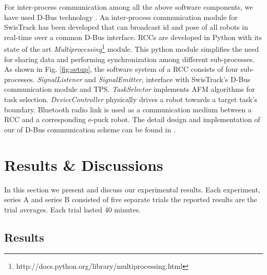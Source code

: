 \documentclass[smallcondensed]{svjour3}
\begin{document}
For inter-process communication among all the above software components, we have used D-Bus technology \citep{Pennington+2010}. An inter-process communication module for SwisTrack has been developed that can broadcast id and pose of all robots in real-time over a common D-Bus interface. RCCs are developed in Python with its state of the art \textit{Multiprocessing}\footnote{http://docs.python.org/library/multiprocessing.html} module. This python module simplifies the need for  sharing data and performing synchronization among different sub-processes. As shown in Fig. \ref{fig:setup}, the software system of a RCC consists of four sub-processes. {\em SignalListener} and {\em SignalEmitter}, interface with SwisTrack's D-Bus communication module and TPS. {\em TaskSelector} implements AFM algorithms for task selection. {\em DeviceController} physically drives a robot towards a target task's boundary. Bluetooth radio link is used as a communication medium between a RCC and a corresponding e-puck robot. The detail design and implementation of our of D-Bus communication scheme can be found in \cite{Sarker2010control}. 
\section{Results \& Discussions}
\label{sec:res}
In this section we present and discuss our experimental results. Each experiment, series A and series B consisted of five separate trials the reported results are the trial averages.  Each trial lasted 40 minutes.
\subsection{Results}
\end{document}
